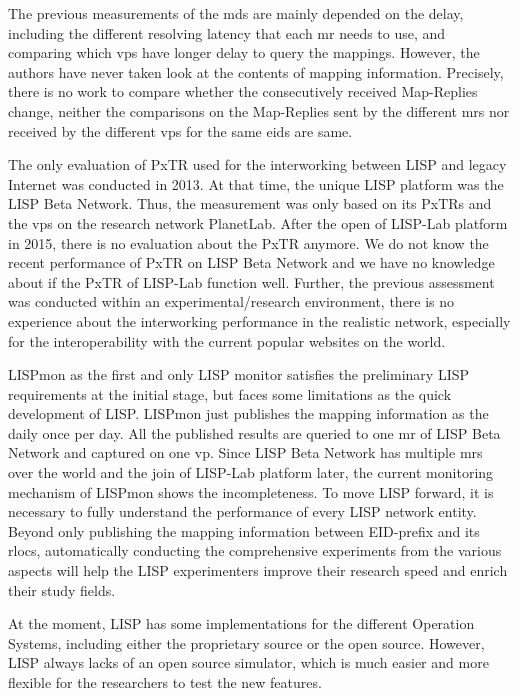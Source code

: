 The previous measurements of the \acrshort{mds} are mainly depended on the delay, including the different resolving latency that each \acrshort{mr} needs to use, and comparing which \acrshort{vp}s have longer delay to query the mappings. However, the authors have never taken look at the contents of mapping information. Precisely, there is no work to compare whether the consecutively received Map-Replies change, neither the comparisons on the Map-Replies sent by the different \acrshort{mr}s nor received by the different \acrshort{vp}s for the same \acrshort{eid}s are same.

The only evaluation of PxTR used for the interworking between LISP and legacy Internet was conducted in 2013. At that time, the unique LISP platform was the LISP Beta Network. Thus, the measurement was only based on its PxTRs and the \acrshort{vp}s on the research network PlanetLab. After the open of LISP-Lab platform in 2015, there is no evaluation about the PxTR anymore. We do not know the recent performance of PxTR on LISP Beta Network and we have no knowledge about if the PxTR of LISP-Lab function well. Further, the previous assessment was conducted within an experimental/research environment, there is no experience about the interworking performance in the realistic network, especially for the interoperability with the current popular websites on the world.

LISPmon as the first and only LISP monitor satisfies the preliminary LISP requirements at the initial stage, but faces some limitations as the quick development of LISP. LISPmon just publishes the mapping information as the daily once per day. All the published results are queried to one \acrshort{mr} of LISP Beta Network and captured on one \acrshort{vp}. Since LISP Beta Network has multiple \acrshort{mr}s over the world and the join of LISP-Lab platform later, the current monitoring mechanism of LISPmon shows the incompleteness. To move LISP forward, it is necessary to fully understand the performance of every LISP network entity. Beyond only publishing the mapping information between EID-prefix and its \acrshort{rloc}s, automatically conducting the comprehensive experiments from the various aspects will help the LISP experimenters improve their research speed and enrich their study fields.

At the moment, LISP has some implementations for the different Operation Systems, including either the proprietary source or the open source. However, LISP always lacks of an open source simulator, which is much easier and more flexible for the researchers to test the new features.

